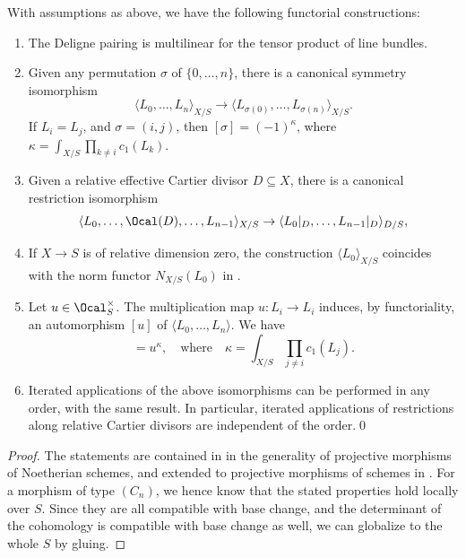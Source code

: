 \begin{proposition}\label{prop:generalpropertiesdeligneproducts}
With assumptions as above, we have the following functorial constructions:

\begin{enumerate}
\item\label{item:Deligne-pairing-multilinear} The Deligne pairing is multilinear for the tensor product of line bundles.
\item\label{item:symmetry-deligne} Given any permutation $\sigma$ of $\lbrace 0,\ldots,n\rbrace$, there is a canonical symmetry isomorphism
\begin{equation}\label{eq:delignepairingsymmetry}
\langle L_0, \ldots,L_n\rangle_{X/S} \to \langle L_{\sigma(0)}, \ldots,L_{\sigma(n)}\rangle_{X/S}.
\end{equation}
If $L_i = L_j$, and $\sigma = (i,j)$, then $[\sigma] = (-1)^{\kappa}$, where $\kappa = \int_{X/S} \prod_{k\neq i} c_1(L_k)$.
\item\label{item:deligne-pairing-restriction} Given a relative effective Cartier divisor $D \subseteq X$, there is a canonical restriction isomorphism
\begin{equation}\label{eq:restrictiondivisor}
\langle L_{0},\ldots, \Ocal(D), \ldots, L_{n-1} \rangle_{X/S} \to \langle L_{0}|_D,\ldots,L_{n-1}|_D\rangle_{D/S},
\end{equation}
\item If $X\to S$ is of relative dimension zero, the construction $\langle L_{0} \rangle_{X/S}$ coincides with the norm functor $N_{X/S}(L_{0})$ in \cite[.5]{EGAII}.
\item\label{item:delmultiplicationbyu} Let $u \in \Ocal_S^\times$. The multiplication map $u: L_i \to L_i$ induces, by functoriality, an automorphism $[u]$ of $\langle L_0, \ldots, L_n \rangle $. We have
\begin{displaymath}
[u] = u^\kappa,\quad\text{where}\quad \kappa=\int_{X/S} \prod_{j\neq i}c_1(L_j).
\end{displaymath}
\item\label{item:order-deligne-pairing-isos} Iterated applications of the above isomorphisms can be performed in any order, with the same result. In particular, iterated applications of restrictions along relative Cartier divisors are independent of the order.\qed
\end{enumerate}
\end{proposition}

\begin{proof}
The statements are contained in \cite{Ducrot} in the generality of projective morphisms of Noetherian schemes, and extended to projective morphisms of schemes in \cite[App.]{Boucksom-Eriksson}. For a morphism of type $(C_{n})$, we hence know that the stated properties hold locally over $S$. Since they are all compatible with base change, and the determinant of the cohomology is compatible with base change as well, we can globalize to the whole $S$ by gluing.
\end{proof}

